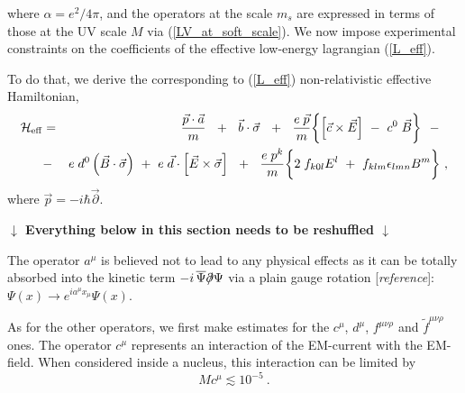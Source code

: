 \documentclass[12pt]{revtex4}
\newcommand{\slashed}[1]{\hbox{{$#1$}\llap{$/$}}}
\begin{document}
        where $ \alpha = e^2/4\pi $,
and the operators at the scale $ m_s $ are expressed
in terms of those at the UV scale $ M $ via
(\ref{LV_at_soft_scale}).
We now impose experimental constraints on the
coefficients of the effective low-energy lagrangian
(\ref{L_eff}).

To do that, we derive the corresponding to (\ref{L_eff}) non-relativistic
effective Hamiltonian,
\begin{eqnarray}
\label{H_eff}
	\mathcal{H}_{\rm eff} 
	& = &
	\frac{\vec{p} \cdot \vec{a}}
                  {m}
	~~+~~
	\vec{b} \cdot \vec{\sigma}
	~~+~~
	\frac{e\; \vec{p}}
             {m}
	\biggl\{
		\left[ \vec{c} \times \vec{E} \right]
		~-~
		c^0\; \vec{B}
	\biggr\}
	~~-~~\\
\nonumber
	& - &
	e \; d^0 \left( \vec{B} \cdot \vec{\sigma} \right)
	~+~
	e\; \vec{d} \cdot
	\left[ \vec{E} \times \vec{\sigma} \right]
	~~+~~	
	\frac{e\; p^k}
               {m}
	\biggl\{
		2\; f_{k0l} E^l 
		~+~
		f_{klm} \epsilon_{lmn}
		B^m
	\biggr\}~,
\end{eqnarray}
	where $ \vec{p} = - i \hbar \vec{\partial} $.

\begin{center}
{\bf
	$\downarrow$ Everything below in this section needs to be reshuffled
	$\downarrow$
}
\end{center}

The operator $ a^\mu $ is believed not to lead to
any physical effects as it can be totally absorbed into
the kinetic term 
$ - i\, \overline{\Psi}\slashed{\partial}\Psi $
via a plain gauge rotation [{\it reference}]:
$ \Psi(x) \to e^{i a^\mu x_\mu} \Psi(x) $.

As for the other operators, we first make estimates for the 
$ c^\mu $, $ d^\mu $, $ f^{\mu\nu\rho} $ and
$ \widetilde{f}^{\mu\nu\rho} $ ones.
The operator $ c^\mu $ represents an interaction of
the EM-current with the EM-field.
When considered inside a nucleus, this interaction
can be limited 
\cite{GrootNibbelink:2004za}
by 
\[
	M c^\mu \lesssim 10^{-5}~.
\]
\end{document}
